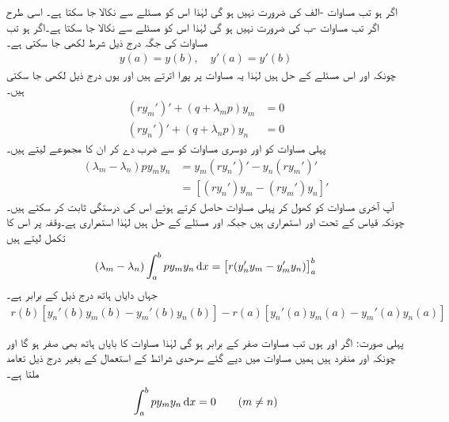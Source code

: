 اگر  ہو تب مساوات -الف کی ضرورت نہیں ہو گی لہٰذا اس کو مسئلے سے نکالا جا سکتا ہے۔ اسی طرح اگر  تب مساوات -ب کی ضرورت نہیں ہو گی لہٰذا اس کو مسئلے سے نکالا جا سکتا ہے۔اگر  ہو تب مساوات  کی جگہ درج ذیل شرط لکھی جا سکتی ہے۔
\begin{align}\label{مساوات_طاقتی_تسلسل_ثبوت_عمودیت_الف}
y(a)=y(b),\quad y'(a)=y'(b)
\end{align}
چونکہ  اور  اس مسئلے کے حل ہیں لہٰذا یہ مساوات  پر پورا اترتے ہیں اور یوں درج ذیل لکھی جا سکتی ہیں۔
\begin{align*}
(ry_m')'+(q+\lambda_m p)y_m&=0\\
(ry_n')'+(q+\lambda_n p)y_n&=0
\end{align*}
پہلی مساوات کو  اور دوسری مساوات کو  سے ضرب دے کر ان کا مجموعے لیتے ہیں۔
\begin{align*}
(\lambda_m-\lambda_n)p y_my_n&=y_m(ry_n')'-y_n(ry_m')'\\
&=[(ry_n')y_m-(ry_m')y_n]'
\end{align*}
آپ آخری مساوات  کو کھول کر پہلی مساوات حاصل کرتے ہوئے اس کی درستگی ثابت کر سکتے ہیں۔چونکہ قیاس کے تحت  اور  استمراری ہیں جبکہ  اور  مسئلے کے حل ہیں لہٰذا  استمراری ہے۔وقفہ  پر اس کا تکمل لیتے ہیں
\begin{align}\label{مساوات_طاقتی_تسلسل_ثبوت_عمودیت_ب}
(\lambda_m-\lambda_n)\int_a^b py_my_n\dif x=\left[r(y_n'y_m-y_m'y_n)\right]_a^b
\end{align}
جہاں دایاں ہاتھ درج ذیل کے برابر ہے۔
\begin{align}\label{مساوات_طاقتی_تسلسل_ثبوت_عمودیت_پ}
r(b)[y_n'(b)y_m(b)-y_m'(b)y_n(b)]-r(a)[y_n'(a)y_m(a)-y_m'(a)y_n(a)]
\end{align}

پہلی صورت: اگر  اور  ہوں تب  مساوات  صفر کے برابر ہو گی لہٰذا مساوات  کا بایاں ہاتھ بھی صفر ہو گا اور چونکہ  اور  منفرد ہیں ہمیں مساوات  میں دیے گئے سرحدی شرائط کے استعمال کے بغیر درج ذیل تعامد ملتا ہے۔
\begin{align}\label{مساوات_طاقتی_تسلسل_ثبوت_عمودیت_ت}
\int_a^b py_my_n\dif x=0\quad \quad (m\ne n)
\end{align} 

